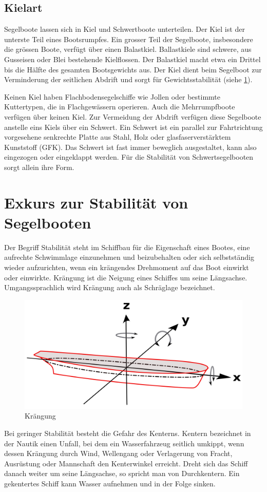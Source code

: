 \subsection{Kielart}
Segelboote lassen sich in Kiel und Schwertboote unterteilen. Der Kiel ist der unterste Teil eines Bootsrumpfes. Ein grosser Teil der Segelboote, insbesondere die grössen Boote, verfügt über einen Balastkiel. Ballastkiele sind schwere, aus Gusseisen oder Blei bestehende Kielflossen. Der Balastkiel macht etwa ein Drittel bis die Hälfte des gesamten Bootsgewichts aus. Der Kiel dient beim Segelboot zur Verminderung der seitlichen Abdrift und sorgt für Gewichtsstabilität (siehe \ref{subchap:exkurs}).

Keinen Kiel haben Flachbodensegelschiffe wie Jollen oder bestimmte Kuttertypen, die in Flachgewässern operieren. Auch die Mehrrumpfboote verfügen über keinen Kiel. Zur Vermeidung der Abdrift verfügen diese Segelboote anstelle eins Kiels über ein Schwert. Ein Schwert ist ein parallel zur Fahrtrichtung vorgesehene senkrechte Platte aus Stahl, Holz oder glasfaserverstärktem Kunststoff (GFK). Das Schwert ist fast immer beweglich ausgestaltet, kann also eingezogen oder eingeklappt werden. Für die Stabilität von Schwertsegelbooten sorgt allein ihre Form.
\section{Exkurs zur Stabilität von Segelbooten}
\label{subchap:exkurs}
Der Begriff Stabilität steht im Schiffbau für die Eigenschaft eines Bootes, eine aufrechte Schwimmlage einzunehmen und beizubehalten oder sich selbstständig wieder aufzurichten, wenn ein krängendes Drehmoment auf das Boot einwirkt oder einwirkte. Krängung ist die Neigung eines Schiffes um seine Längsachse. \cite{noauthor_stabilitat_2023}  Umgangssprachlich wird Krängung auch als Schräglage bezeichnet.
\begin{figure}[H]
    \centering
    \includegraphics[width=0.75\linewidth]{assets/Achsen_Schiffsbewegung.svg.png}
    \caption{Krängung}
    \label{fig:enter-label}
\end{figure}
Bei geringer Stabilität besteht die Gefahr des Kenterns. Kentern bezeichnet in der Nautik einen Unfall, bei dem ein Wasserfahrzeug seitlich umkippt, wenn dessen Krängung durch Wind, Wellengang oder Verlagerung von Fracht, Ausrüstung oder Mannschaft den Kenterwinkel erreicht. Dreht sich das Schiff danach weiter um seine Längsachse, so spricht man von Durchkentern. Ein gekentertes Schiff kann Wasser aufnehmen und in der Folge sinken.  

